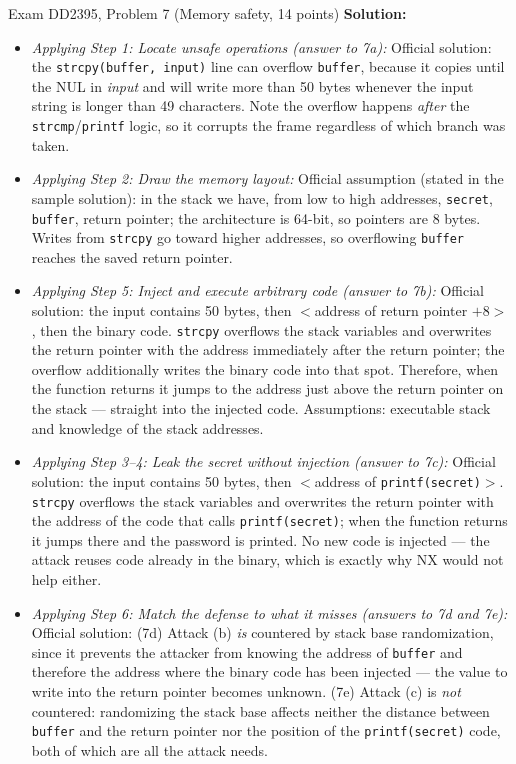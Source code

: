 \documentclass[12pt, a4paper]{article}
\begin{document}
\begin{practicebox}{Exam DD2395, Problem 7 (Memory safety, 14 points)}
\textbf{Solution:}
\begin{itemize}
    \item \textit{Applying Step 1: Locate unsafe operations (answer to 7a):} Official solution: the \texttt{strcpy(buffer, input)} line can overflow \texttt{buffer}, because it copies until the NUL in \emph{input} and will write more than 50 bytes whenever the input string is longer than 49 characters.
    Note the overflow happens \emph{after} the \texttt{strcmp}/\texttt{printf} logic, so it corrupts the frame regardless of which branch was taken.
    \item \textit{Applying Step 2: Draw the memory layout:} Official assumption (stated in the sample solution): in the stack we have, from low to high addresses, \texttt{secret}, \texttt{buffer}, return pointer; the architecture is 64-bit, so pointers are 8 bytes.
    Writes from \texttt{strcpy} go toward higher addresses, so overflowing \texttt{buffer} reaches the saved return pointer.
    \item \textit{Applying Step 5: Inject and execute arbitrary code (answer to 7b):} Official solution: the input contains 50 bytes, then $<$address of return pointer $+ 8>$, then the binary code. \texttt{strcpy} overflows the stack variables and overwrites the return pointer with the address immediately after the return pointer;
    the overflow additionally writes the binary code into that spot. Therefore, when the function returns it jumps to the address just above the return pointer on the stack --- straight into the injected code. Assumptions: executable stack and knowledge of the stack addresses.
    \item \textit{Applying Step 3--4: Leak the secret without injection (answer to 7c):} Official solution: the input contains 50 bytes, then $<$address of \texttt{printf(secret)}$>$. \texttt{strcpy} overflows the stack variables and overwrites the return pointer with the address of the code that calls \texttt{printf(secret)};
    when the function returns it jumps there and the password is printed. No new code is injected --- the attack reuses code already in the binary, which is exactly why NX would not help either.
    \item \textit{Applying Step 6: Match the defense to what it misses (answers to 7d and 7e):} Official solution: (7d) Attack (b) \emph{is} countered by stack base randomization, since it prevents the attacker from knowing the address of \texttt{buffer} and therefore the address where the binary code has been injected --- the value to write into the return pointer becomes unknown. (7e) Attack (c) is \emph{not} countered: randomizing the stack base affects neither the distance between \texttt{buffer} and the return pointer nor the position of the \texttt{printf(secret)} code, both of which are all the attack needs.

\end{itemize}
\end{practicebox}
\end{document}
